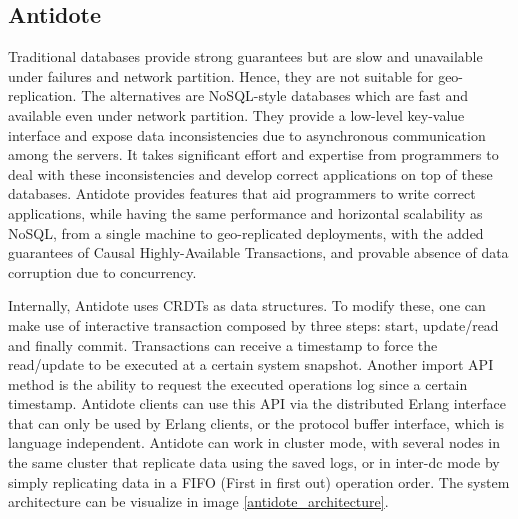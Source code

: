 \subsection{Antidote}
\label{sec:antidote_intro}
Traditional databases provide strong guarantees but are slow and unavailable under failures and network partition. Hence, they are not suitable for geo-replication. The alternatives are NoSQL-style databases which are fast and available even under network partition. They provide a low-level key-value interface and expose data inconsistencies due to asynchronous communication among the servers. It takes significant effort and expertise from programmers to deal with these inconsistencies and develop correct applications on top of these databases. Antidote provides features that aid programmers to write correct applications, while having the same performance and horizontal scalability as NoSQL, from a single machine to geo-replicated deployments, with the added guarantees of Causal Highly-Available Transactions, and provable absence of data corruption due to concurrency.\par
	Internally, Antidote uses CRDTs as data structures. To modify these, one can make use of interactive transaction composed by three steps: start, update/read and finally commit. Transactions can receive a timestamp to force the read/update to be executed at a certain system snapshot. Another import API method is the ability to request the executed operations log since a certain timestamp. Antidote clients can use this API via the distributed Erlang interface that can only be used by Erlang clients, or the protocol buffer interface, which is language independent. Antidote can work in cluster mode, with several nodes in the same cluster that replicate data using the saved logs, or in inter-dc mode by simply replicating data in a FIFO (First in first out) operation order. The system architecture can be visualize in image \ref{antidote_architecture}.

